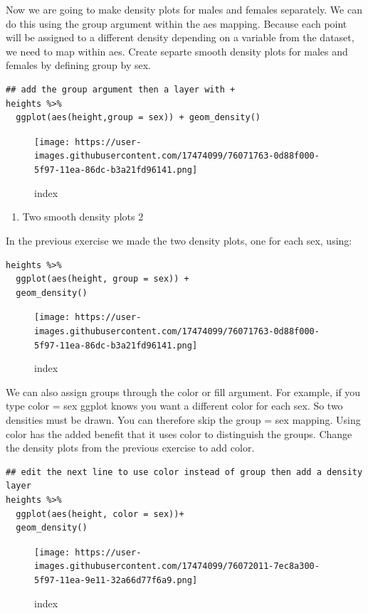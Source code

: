 \documentclass[
]{article}
\providecommand{\tightlist}{%
  \setlength{\itemsep}{0pt}\setlength{\parskip}{0pt}}
\begin{document}
Now we are going to make density plots for males and females separately.
We can do this using the group argument within the aes mapping. Because
each point will be assigned to a different density depending on a
variable from the dataset, we need to map within aes. Create separte
smooth density plots for males and females by defining group by sex.

\begin{verbatim}
## add the group argument then a layer with +
heights %>% 
  ggplot(aes(height,group = sex)) + geom_density()
\end{verbatim}

\begin{figure}
\centering
\texttt{[image: https://user-images.githubusercontent.com/17474099/76071763-0d88f000-5f97-11ea-86dc-b3a21fd96141.png]}
\caption{index}
\end{figure}

\begin{enumerate}
\def\labelenumi{\arabic{enumi}.}
\setcounter{enumi}{20}
\tightlist
\item
  Two smooth density plots 2
\end{enumerate}

In the previous exercise we made the two density plots, one for each
sex, using:

\begin{verbatim}
heights %>% 
  ggplot(aes(height, group = sex)) + 
  geom_density()
\end{verbatim}

\begin{figure}
\centering
\texttt{[image: https://user-images.githubusercontent.com/17474099/76071763-0d88f000-5f97-11ea-86dc-b3a21fd96141.png]}
\caption{index}
\end{figure}

We can also assign groups through the color or fill argument. For
example, if you type color = sex ggplot knows you want a different color
for each sex. So two densities must be drawn. You can therefore skip the
group = sex mapping. Using color has the added benefit that it uses
color to distinguish the groups. Change the density plots from the
previous exercise to add color.

\begin{verbatim}
## edit the next line to use color instead of group then add a density layer
heights %>% 
  ggplot(aes(height, color = sex))+
  geom_density()
\end{verbatim}

\begin{figure}
\centering
\texttt{[image: https://user-images.githubusercontent.com/17474099/76072011-7ec8a300-5f97-11ea-9e11-32a66d77f6a9.png]}
\caption{index}
\end{figure}
\end{document}
